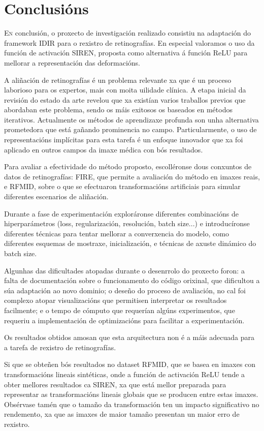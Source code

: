 \chapter{Conclusións}
\label{chap:Conclusións}

\lettrine{E}{n} conclusión, o proxecto de investigación realizado consistiu na adaptación do framework IDIR para o rexistro de retinografías.
En especial valoramos o uso da función de activación SIREN, proposta como alternativa á función ReLU para mellorar a representación das deformacións.

A aliñación de retinografías é un problema relevante xa que é un proceso laborioso para os expertos, mais con moita uilidade clínica.
A etapa inicial da revisión do estado da arte revelou que xa existían varios traballos previos que abordaban este problema, sendo os máis exitosos os baseados en métodos iterativos.
Actualmente os métodos de aprendizaxe profunda son unha alternativa prometedora que está gañando prominencia no campo. Particularmente, o uso de representacións implícitas para esta tarefa é un enfoque innovador que xa foi aplicado en outros campos da imaxe médica con bós resultados.

Para avaliar a efectividade do método proposto, escolléronse dous conxuntos de datos de retinografías: FIRE, que permite a avaliación do método en imaxes reais, e RFMID, sobre o que se efectuaron transformacións artificiais para simular diferentes escenarios de aliñación.

Durante a fase de experimentación exploráronse diferentes combinacións de hiperparámetros (loss, regularización, resolución, batch size...) e introducíronse diferentes técnicas para tentar mellorar a converxencia do modelo, como diferentes esquemas de mostraxe, inicialización, e técnicas de axuste dinámico do batch size.

Algunhas das dificultades atopadas durante o desenrrolo do proxecto foron: a falta de documentación sobre o funcionamento do código orixinal, que dificultou a súa adaptación ao novo dominio; o deseño do proceso de avaliación, no cal foi complexo atopar visualizacións que permitisen interpretar os resultados facilmente; e o tempo de cómputo que requerían algúns experimentos, que requeriu a implementación de optimizacións para facilitar a experimentación.

Os resultados obtidos amosan que esta arquitectura non é a máis adecuada para a tarefa de rexistro de retinografías.

Si que se obteñen bós resultados no dataset RFMID, que se basea en imaxes con transformacións lineais sintéticas, onde a función de activación ReLU tende a obter mellores resultados ca SIREN, xa que está mellor preparada para representar as transformacións lineais globais que se producen entre estas imaxes.
Obsérvase tamén que o tamaño da transformación ten un impacto significativo no rendemento, xa que as imaxes de maior tamaño presentan un maior erro de rexistro.

